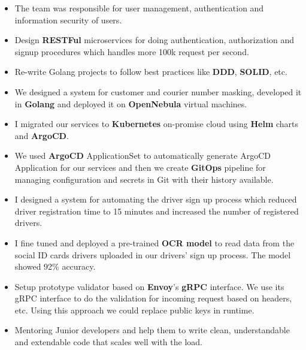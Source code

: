 \vspace{0.5cm}

\begin{itemize}
      \item The team was responsible for user management, authentication and information security of users.
      \item Design \textbf{RESTFul} microservices for doing authentication, authorization and signup procedures which handles more 100k request per second.
      \item Re-write Golang projects to follow best practices like \textbf{DDD}, \textbf{SOLID}, etc.
      \item We designed a system for customer and courier number masking, developed it in \textbf{Golang} and deployed it on \textbf{OpenNebula} virtual machines.
      \item I migrated our services to \textbf{Kubernetes} on-promise cloud using \textbf{Helm} charts and \textbf{ArgoCD}.
      \item We used \textbf{ArgoCD} ApplicationSet to automatically generate ArgoCD Application for our services and then we create \textbf{GitOps} pipeline for managing configuration and secrets in Git with their history available.
      \item I designed a system for automating the driver sign up process which reduced driver registration time to 15 minutes and increased the number of registered drivers.
      \item I fine tuned and deployed a pre-trained \textbf{OCR model} to read data from the social ID cards drivers uploaded in our drivers' sign up process. The model showed 92\% accuracy.
      \item Setup prototype validator based on \textbf{Envoy}'s \textbf{gRPC} interface. We use its gRPC interface to do the validation for incoming request
            based on headers, etc. Using this approach we could replace public keys in runtime.
      \item Mentoring Junior developers and help them to write clean, understandable and extendable code that scales well with the load.
\end{itemize}

\vspace{0.5cm}

